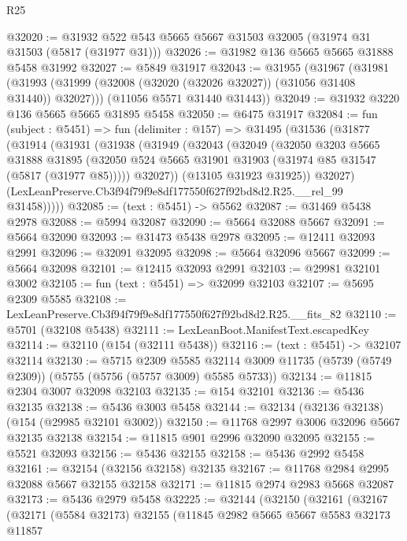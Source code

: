 \begin{lexlean}{R25}
\begin{coremodule}
@32020 := @31932 @522 @543 @5665 @5667 @31503 @32005 (@31974 @31 @31503 (@5817 (@31977 @31)))
@32026 := @31982 @136 @5665 @5665 @31888 @5458 @31992
@32027 := @5849 @31917
@32043 := @31955
    (@31967
      (@31981 (@31993 (@31999 (@32008 (@32020 (@32026 @32027)) (@31056 @31408 @31440)) @32027)))
      (@11056 @5571 @31440 @31443))
@32049 := @31932 @3220 @136 @5665 @5665 @31895 @5458
@32050 := @6475 @31917
@32084 := fun (subject : @5451) =>
  fun (delimiter : @157) =>
  @31495
    (@31536
      (@31877
        (@31914
          (@31931
            (@31938
              (@31949
                (@32043
                  (@32049
                    (@32050
                      @3203
                      @5665
                      @31888
                      @31895
                      (@32050 @524 @5665 @31901 @31903 (@31974 @85 @31547 (@5817 (@31977 @85)))))
                    @32027))
                (@13105 @31923 @31925))
              @32027)
            (LexLeanPreserve.Cb3f94f79f9e8df177550f627f92bd8d2.R25.__rel_99 @31458)))))
@32085 := (text : @5451) -> @5562
@32087 := @31469 @5438 @2978
@32088 := @5994 @32087
@32090 := @5664 @32088 @5667
@32091 := @5664 @32090
@32093 := @31473 @5438 @2978
@32095 := @12411 @32093 @2991
@32096 := @32091 @32095
@32098 := @5664 @32096 @5667
@32099 := @5664 @32098
@32101 := @12415 @32093 @2991
@32103 := @29981 @32101 @3002
@32105 := fun (text : @5451) => @32099 @32103
@32107 := @5695 @2309 @5585
@32108 := LexLeanPreserve.Cb3f94f79f9e8df177550f627f92bd8d2.R25.__fits_82
@32110 := @5701 (@32108 @5438)
@32111 := LexLeanBoot.ManifestText.escapedKey
@32114 := @32110 (@154 (@32111 @5438))
@32116 := (text : @5451) -> @32107 @32114
@32130 := @5715
    @2309
    @5585
    @32114
    @3009
    @11735
    (@5739 (@5749 @2309))
    (@5755 (@5756 (@5757 @3009) @5585 @5733))
@32134 := @11815 @2304 @3007 @32098 @32103
@32135 := @154 @32101
@32136 := @5436 @32135
@32138 := @5436 @3003 @5458
@32144 := @32134 (@32136 @32138) (@154 (@29985 @32101 @3002))
@32150 := @11768 @2997 @3006 @32096 @5667 @32135 @32138
@32154 := @11815 @901 @2996 @32090 @32095
@32155 := @5521 @32093
@32156 := @5436 @32155
@32158 := @5436 @2992 @5458
@32161 := @32154 (@32156 @32158) @32135
@32167 := @11768 @2984 @2995 @32088 @5667 @32155 @32158
@32171 := @11815 @2974 @2983 @5668 @32087
@32173 := @5436 @2979 @5458
@32225 := @32144
    (@32150
      (@32161
        (@32167
          (@32171
            (@5584 @32173)
            @32155
            (@11845
              @2982
              @5665
              @5667
              @5583
              @32173
              @11857

\end{coremodule}
\end{lexlean}
